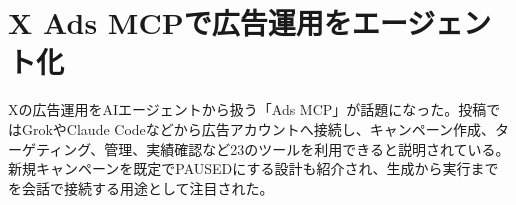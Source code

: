\section{X Ads MCPで広告運用をエージェント化}
Xの広告運用をAIエージェントから扱う「Ads MCP」が話題になった。投稿ではGrokやClaude Codeなどから広告アカウントへ接続し、キャンペーン作成、ターゲティング、管理、実績確認など23のツールを利用できると説明されている。新規キャンペーンを既定でPAUSEDにする設計も紹介され、生成から実行までを会話で接続する用途として注目された。
